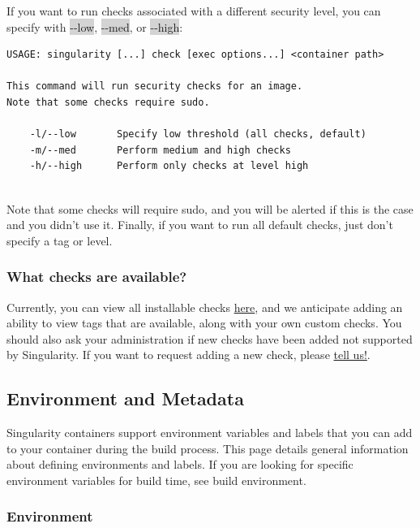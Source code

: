 \documentclass[a4paper]{article}
\begin{document}
If you want to run checks associated with a different security level, you can specify with \colorbox{lightgray}{-{}-low}, \colorbox{lightgray}{-{}-med}, or \colorbox{lightgray}{-{}-high}:

\begin{lstlisting}[frame=single]
USAGE: singularity [...] check [exec options...] <container path>

This command will run security checks for an image.
Note that some checks require sudo.

    -l/--low       Specify low threshold (all checks, default) 
    -m/--med       Perform medium and high checks
    -h/--high      Perform only checks at level high
  
\end{lstlisting}

    Note that some checks will require sudo, and you will be alerted if this is the case and you didn’t use it. Finally, if you want to run all default checks, just don’t specify a tag or level.

\subsubsection{What checks are available?}

Currently, you can view all installable checks \href{https://github.com/singularityware/singularity/blob/development/libexec/helpers/check.sh#L49}{here}, and we anticipate adding an ability to view tags that are available, along with your own custom checks. You should also ask your administration if new checks have been added not supported by Singularity. If you want to request adding a new check, please \href{https://github.com/singularityware/singularity/issues}{tell us!}.

\subsection{Environment and Metadata}
\label{sec:envandmetadata}

Singularity containers support environment variables and labels that you can add to your container during the build process. This page details general information about defining environments and labels. If you are looking for specific environment variables for build time, see build environment.

\subsubsection{Environment}
\end{document}
